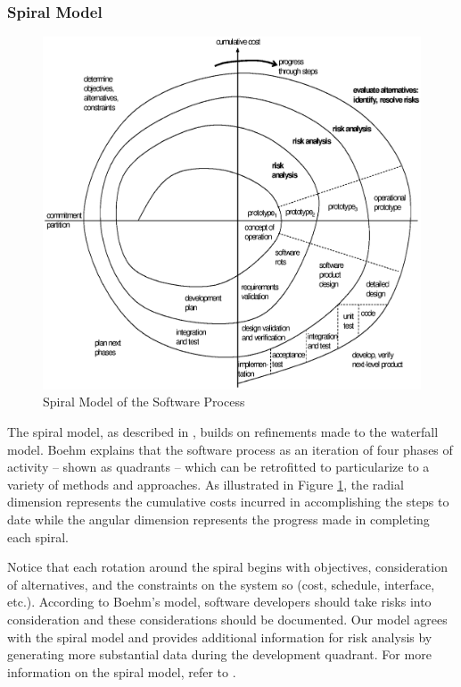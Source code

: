 \subsubsection{Spiral Model}\label{spiral}
\begin{figure}[t]
\begin{center}
\includegraphics[scale=0.7]{images/spiral.eps}
\end{center}
\caption{Spiral Model of the Software Process}
\label{fig:spiral}
\end{figure}

The spiral model, as described in \cite{Boehm1986}, builds on refinements made
to the waterfall model. Boehm explains that the software process as an iteration
of four phases of activity -- shown as quadrants -- which can be retrofitted to
particularize to a variety of methods and approaches. As illustrated in Figure
\ref{fig:spiral}, the radial dimension represents the cumulative costs incurred
in accomplishing the steps to date while the angular dimension represents the
progress made in completing each spiral.

Notice that each rotation around the spiral begins with objectives,
consideration of alternatives, and the constraints on the system so (cost,
schedule, interface, etc.). According to Boehm's model, software developers
should take risks into consideration and these considerations should be
documented. Our model agrees with the spiral model and provides additional
information for risk analysis by generating more substantial data during the
development quadrant. For more information on the spiral model, refer to
\cite{Boehm1986}.
